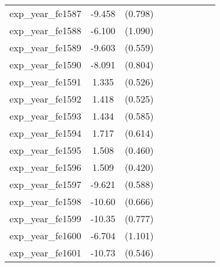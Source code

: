{\begin{tabular}{l*{4}{cc}}
exp\_year\_fe1587&   -9.458\sym{***}&  (0.798)&                  &         &                  &         &                  &         \\
exp\_year\_fe1588&   -6.100\sym{***}&  (1.090)&                  &         &                  &         &                  &         \\
exp\_year\_fe1589&   -9.603\sym{***}&  (0.559)&                  &         &                  &         &                  &         \\
exp\_year\_fe1590&   -8.091\sym{***}&  (0.804)&                  &         &                  &         &                  &         \\
exp\_year\_fe1591&    1.335\sym{*}  &  (0.526)&                  &         &                  &         &                  &         \\
exp\_year\_fe1592&    1.418\sym{**} &  (0.525)&                  &         &                  &         &                  &         \\
exp\_year\_fe1593&    1.434\sym{*}  &  (0.585)&                  &         &                  &         &                  &         \\
exp\_year\_fe1594&    1.717\sym{**} &  (0.614)&                  &         &                  &         &                  &         \\
exp\_year\_fe1595&    1.508\sym{**} &  (0.460)&                  &         &                  &         &                  &         \\
exp\_year\_fe1596&    1.509\sym{***}&  (0.420)&                  &         &                  &         &                  &         \\
exp\_year\_fe1597&   -9.621\sym{***}&  (0.588)&                  &         &                  &         &                  &         \\
exp\_year\_fe1598&   -10.60\sym{***}&  (0.666)&                  &         &                  &         &                  &         \\
exp\_year\_fe1599&   -10.35\sym{***}&  (0.777)&                  &         &                  &         &                  &         \\
exp\_year\_fe1600&   -6.704\sym{***}&  (1.101)&                  &         &                  &         &                  &         \\
exp\_year\_fe1601&   -10.73\sym{***}&  (0.546)&                  &         &                  &         &                  &         \\

\end{tabular}}
